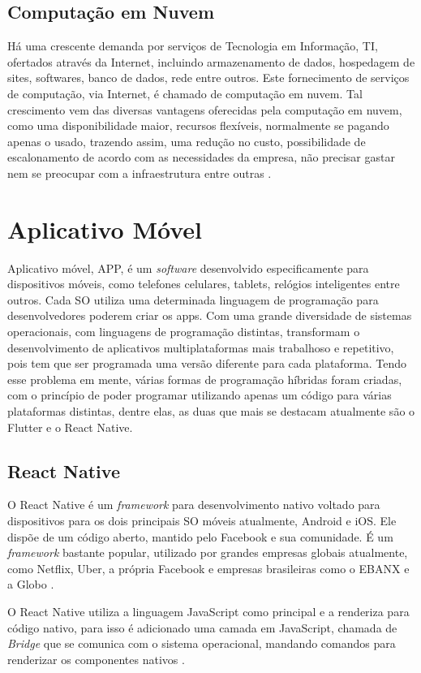 
\subsection{Computação em Nuvem}
\label{fund:nuvem}
Há uma crescente demanda por serviços de Tecnologia em Informação, TI, ofertados através da Internet, incluindo armazenamento de dados, hospedagem de sites, softwares, banco de dados, rede entre outros. Este fornecimento de serviços de computação, via Internet, é chamado de computação em nuvem. Tal crescimento vem das diversas vantagens oferecidas pela computação em nuvem, como uma disponibilidade maior, recursos flexíveis, normalmente se pagando apenas o usado, trazendo assim, uma redução no custo, possibilidade de escalonamento de acordo com as necessidades da empresa, não precisar gastar nem se preocupar com a infraestrutura entre outras \cite{sousa2009computaccao}.

\section{Aplicativo Móvel}
\label{fund:app}
Aplicativo móvel, APP, é um \textit{software} desenvolvido especificamente para dispositivos móveis, como telefones celulares, tablets, relógios inteligentes entre outros. Cada SO utiliza uma determinada linguagem de programação para desenvolvedores poderem criar os apps. Com uma grande diversidade de sistemas operacionais, com linguagens de programação distintas, transformam o desenvolvimento de aplicativos multiplataformas mais trabalhoso e repetitivo, pois tem que ser programada uma versão diferente para cada plataforma. Tendo esse problema em mente, várias formas de programação híbridas foram criadas, com o princípio de poder programar utilizando apenas um código para várias plataformas distintas, dentre elas, as duas que mais se destacam atualmente são o Flutter e o React Native.

\subsection{React Native}
\label{fund:react-native}
O React Native é um \textit{framework} para desenvolvimento nativo voltado para dispositivos para os dois principais SO móveis atualmente, Android e iOS. Ele dispõe de um código aberto, mantido pelo Facebook e sua comunidade. É um \textit{framework} bastante popular, utilizado por grandes empresas globais atualmente, como Netflix, Uber, a própria Facebook e empresas brasileiras como o EBANX e a Globo \cite{empresasbrreact}.

O React Native utiliza a linguagem JavaScript como principal e a renderiza para código nativo, para isso é adicionado uma camada em JavaScript, chamada de \textit{Bridge} que se comunica com o sistema operacional, mandando comandos para renderizar os componentes nativos \cite{docreactnative}.

